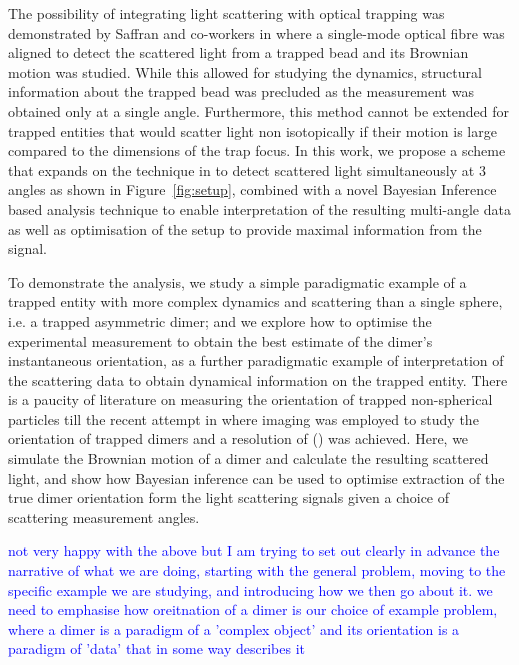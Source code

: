\documentclass[final, 3p]{elsarticle}
\begin{document}
The possibility of integrating light scattering with optical trapping was demonstrated by Saffran and co-workers in \cite{Bar-Ziv_1998} where a single-mode optical fibre was aligned to detect the scattered light from a trapped bead and its Brownian motion was studied. While this allowed for studying the dynamics, structural information about the trapped bead was precluded as the measurement was obtained only at a single angle. Furthermore, this method cannot be extended for trapped entities that would scatter light non isotopically if their motion is large compared to the dimensions of the trap focus. In this work, we propose a scheme that expands on the technique in \cite{Bar-Ziv_1998} to detect scattered light simultaneously at 3 angles as shown in Figure~\ref{fig:setup}, combined with a novel Bayesian Inference based analysis technique to enable interpretation of the resulting multi-angle data as well as optimisation of the setup to provide maximal information from the signal. 

To demonstrate the analysis, we study a simple paradigmatic example of a trapped entity with more complex dynamics and scattering than a single sphere, i.e. a trapped asymmetric dimer; and we explore how to optimise the experimental measurement to obtain the best estimate of the dimer's instantaneous orientation, as a further paradigmatic example of interpretation of the scattering data to obtain dynamical information on the trapped entity. There is a paucity of literature on measuring the orientation of trapped non-spherical particles till the recent attempt in \cite{raudsepp2022estimating} where imaging was employed to study the orientation of trapped dimers and a resolution of () was achieved. Here, we simulate the Brownian motion of a dimer and calculate the resulting scattered light, and show how Bayesian inference can be used to optimise extraction of the true dimer orientation form the light scattering signals given a choice of scattering measurement angles. 

\textcolor{blue} {not very happy with the above but I am trying to set out clearly in advance the narrative of what we are doing, starting with the general problem, moving to the specific example we are studying, and introducing how we then go about it. we need to emphasise how oreitnation of a dimer is our choice of example problem, where a dimer is a paradigm of a 'complex object' and its orientation is a paradigm of 'data' that in some way describes it}
\end{document}
